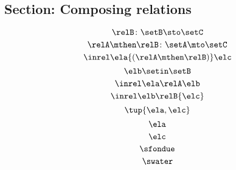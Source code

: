 {\begin{forslides}
        \subsection{Section: Composing relations}

        \begin{equation}
            \label{eq:slides_session2_rel_84}
            \relB \colon \setB \sto \setC
        \end{equation}
        \begin{equation}
            \label{eq:slides_session2_rel_85}
            \relA \mthen \relB \colon \setA \mto \setC
        \end{equation}
        \begin{equation}
            \label{eq:slides_session2_rel_86}
            \inrel \ela {(\relA \mthen \relB)} \elc
        \end{equation}
        \begin{equation}
            \label{eq:slides_session2_rel_87}
            \elb \setin \setB
        \end{equation}
        \begin{equation}
            \label{eq:slides_session2_rel_88}
            \inrel \ela \relA \elb
        \end{equation}
        \begin{equation}
            \label{eq:slides_session2_rel_89}
            \inrel \elb \relB{\elc}
        \end{equation}
        \begin{equation}
            \label{eq:slides_session2_rel_90}
            \tup{\ela,\elc}
        \end{equation}
        \begin{equation}
            \label{eq:slides_session2_rel_91}
            \ela
        \end{equation}
        \begin{equation}
            \label{eq:slides_session2_rel_92}
            \elc
        \end{equation}
        \begin{equation}
            \label{eq:slides_session2_rel_93}
            \sfondue
        \end{equation}
        \begin{equation}
            \label{eq:slides_session2_rel_94}
            \swater
        \end{equation}
        \begin{equation}
            \label{eq:slides_session2_rel_95}

\end{equation}
\end{forslides}}
